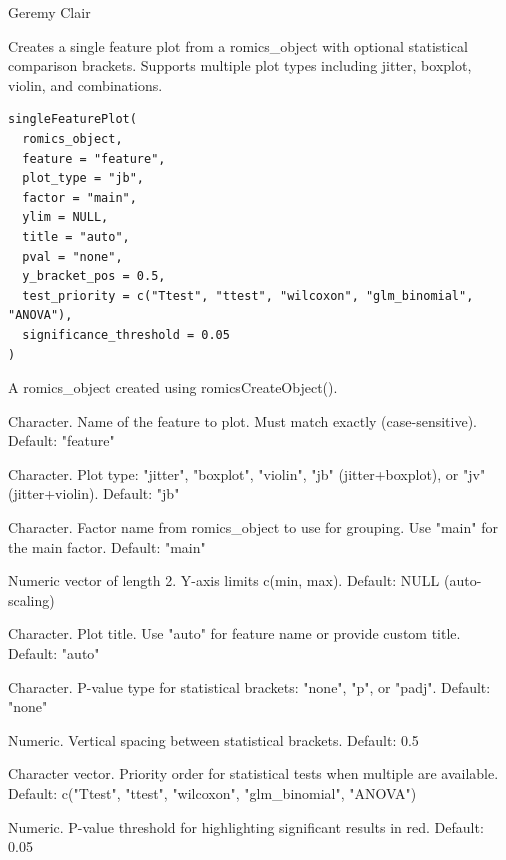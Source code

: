 \documentclass[a4paper]{book}
\begin{document}
%
\begin{Author}
Geremy Clair
\end{Author}
%
\begin{Description}
Creates a single feature plot from a romics\_object with optional statistical comparison brackets. Supports multiple plot types including jitter, boxplot, violin, and combinations.
\end{Description}
%
\begin{Usage}
\begin{verbatim}
singleFeaturePlot(
  romics_object,
  feature = "feature",
  plot_type = "jb",
  factor = "main",
  ylim = NULL,
  title = "auto",
  pval = "none",
  y_bracket_pos = 0.5,
  test_priority = c("Ttest", "ttest", "wilcoxon", "glm_binomial", "ANOVA"),
  significance_threshold = 0.05
)
\end{verbatim}
\end{Usage}
%
\begin{Arguments}
\begin{ldescription}
\item[\code{romics\_object}] A romics\_object created using romicsCreateObject().

\item[\code{feature}] Character. Name of the feature to plot. Must match exactly (case-sensitive). Default: "feature"

\item[\code{plot\_type}] Character. Plot type: "jitter", "boxplot", "violin", "jb" (jitter+boxplot), or "jv" (jitter+violin). Default: "jb"

\item[\code{factor}] Character. Factor name from romics\_object to use for grouping. Use "main" for the main factor. Default: "main"

\item[\code{ylim}] Numeric vector of length 2. Y-axis limits c(min, max). Default: NULL (auto-scaling)

\item[\code{title}] Character. Plot title. Use "auto" for feature name or provide custom title. Default: "auto"

\item[\code{pval}] Character. P-value type for statistical brackets: "none", "p", or "padj". Default: "none"

\item[\code{y\_bracket\_pos}] Numeric. Vertical spacing between statistical brackets. Default: 0.5

\item[\code{test\_priority}] Character vector. Priority order for statistical tests when multiple are available. Default: c("Ttest", "ttest", "wilcoxon", "glm\_binomial", "ANOVA")

\item[\code{significance\_threshold}] Numeric. P-value threshold for highlighting significant results in red. Default: 0.05
\end{ldescription}
\end{Arguments}
\end{document}
